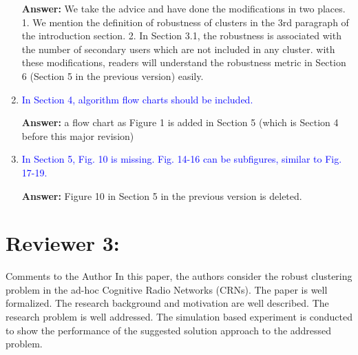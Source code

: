 \documentclass[10pt,a4paper]{article}
\begin{document}
\begin{enumerate}
\textbf{Answer:} We take the advice and have done the modifications in two places.
1. We mention the definition of robustness of clusters in the 3rd paragraph of the introduction section.
2. In Section 3.1, the robustness is associated with the number of secondary users which are not included in any cluster.
with these modifications, readers will understand the robustness metric in Section 6 (Section 5 in the previous version) easily. 


\item \textcolor{blue}{ In Section 4, algorithm flow charts should be included.}

\textbf{Answer:} a flow chart as Figure 1 is added in Section 5 (which is Section 4 before this major revision)

\item \textcolor{blue}{ In Section 5, Fig. 10 is missing. Fig. 14-16 can be subfigures, similar to Fig. 17-19.}

\textbf{Answer:} Figure 10 in Section 5 in the previous version is deleted.

\end{enumerate}

\section{Reviewer 3:}


Comments to the Author
In this paper, the authors consider the robust clustering problem in the ad-hoc Cognitive Radio Networks (CRNs). The paper is well formalized. The research background and motivation are well described. The research problem is well addressed. The simulation based experiment is conducted to show the performance of the suggested solution approach to the addressed problem.
\end{document}
